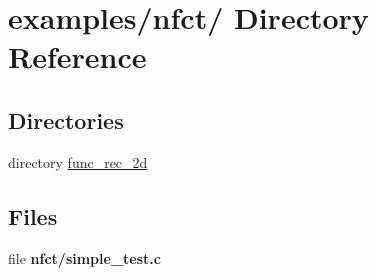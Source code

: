 \hypertarget{dir_000020}{
\section{examples/nfct/ Directory Reference}
\label{dir_000020}
}
\subsection*{Directories}
\begin{CompactItemize}
\item 
directory \hyperlink{dir_000021}{func\_\-rec\_\-2d}
\end{CompactItemize}
\subsection*{Files}
\begin{CompactItemize}
\item 
file {\bf nfct/simple\_\-test.c}
\end{CompactItemize}
